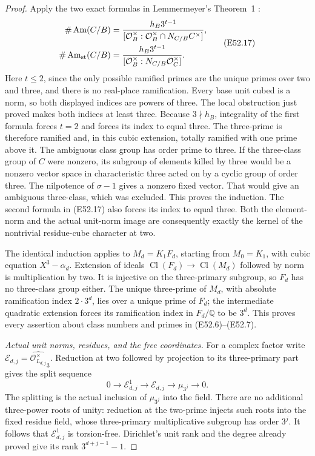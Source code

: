 \begin{proof}
Apply the two exact formulas in
Lemmermeyer's Theorem~1
\cite{E_LemmermeyerAmbiguous}:
\[
 \begin{split}
 \#\operatorname{Am}(C/B)
   &=\frac{h_B3^{t-1}}
       {[\mathcal O_B^\times:
          \mathcal O_B^\times\cap N_{C/B}C^\times]},\\
 \#\operatorname{Am}_{\rm st}(C/B)
   &=\frac{h_B3^{t-1}}
       {[\mathcal O_B^\times:N_{C/B}\mathcal O_C^\times]}.
 \end{split}
 \tag{E52.17}
\]
Here $t\le2$, since the only possible
ramified primes are the unique
primes over two and three, and
there is no real-place ramification.
Every base unit cubed is a norm,
so both displayed indices are
powers of three. The local
obstruction just proved makes
both indices at least three.
Because $3\nmid h_B$, integrality
of the first formula forces $t=2$
and forces its index to equal
three. The three-prime is
therefore ramified and, in this
cubic extension, totally ramified
with one prime above it.
The ambiguous class group has
order prime to three. If the
three-class group of $C$ were
nonzero, its subgroup of
elements killed by three would
be a nonzero vector space in
characteristic three acted on
by a cyclic group of order
three. The nilpotence of
$\sigma-1$ gives a nonzero
fixed vector. That would
give an ambiguous three-class,
which was excluded.
This proves the induction.
The second formula in
(E52.17) also forces its
index to equal three.
Both the element-norm and
the actual unit-norm image
are consequently exactly
the kernel of the nontrivial
residue-cube character at two.

The identical induction applies
to $M_d=K_1F_d$, starting from
$M_0=K_1$, with cubic equation
$X^3-\alpha_d$.
Extension of ideals
$\operatorname{Cl}(F_d)\to
\operatorname{Cl}(M_d)$
followed by norm is
multiplication by two.
It is injective on the
three-primary subgroup,
so $F_d$ has no three-class
group either.
The unique three-prime of
$M_d$, with absolute
ramification index $2\cdot3^d$,
lies over a unique prime of
$F_d$; the intermediate
quadratic extension forces
its ramification index in
$F_d/\mathbb Q$ to be $3^d$.
This proves every assertion
about class numbers and
primes in (E52.6)--(E52.7).

\emph{Actual unit norms, residues, and the free coordinates.}
For a complex factor write
$\mathcal E_{d,j}=
\widehat{\mathcal O_{L_{d,j}}^\times}_3$.
Reduction at two followed by
projection to its three-primary
part gives the split sequence
\[
 0\longrightarrow\mathcal E_{d,j}^1
 \longrightarrow\mathcal E_{d,j}
 \longrightarrow\mu_{3^j}\longrightarrow0.
 \tag{E52.18}
\]
The splitting is the actual
inclusion of $\mu_{3^j}$
into the field.
There are no additional
three-power roots of unity:
reduction at the two-prime
injects such roots into the
fixed residue field, whose
three-primary multiplicative
subgroup has order $3^j$.
It follows that
$\mathcal E_{d,j}^1$ is
torsion-free. Dirichlet's
unit rank and the degree
already proved give its
rank $3^{d+j-1}-1$.


\end{proof}
